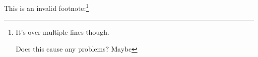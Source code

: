 \documentclass{article}
\begin{document}
This is an invalid footnote:\footnote{It's over multiple lines though.

Does this cause any problems? Maybe}
\end{document}
